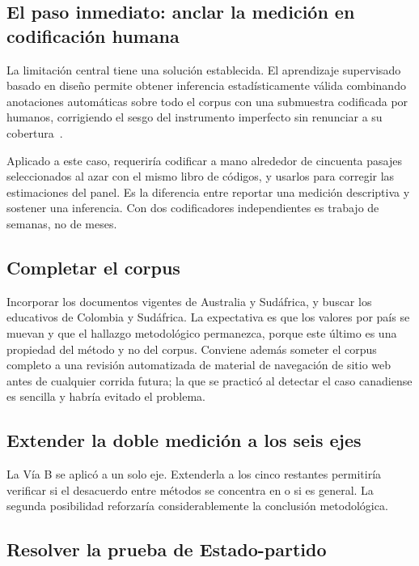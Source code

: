 \subsection{El paso inmediato: anclar la medición en codificación humana}

La limitación central tiene una solución establecida. El aprendizaje supervisado basado en diseño permite obtener inferencia estadísticamente válida combinando anotaciones automáticas sobre todo el corpus con una submuestra codificada por humanos, corrigiendo el sesgo del instrumento imperfecto sin renunciar a su cobertura~\citep{egami2023dsl}.

Aplicado a este caso, requeriría codificar a mano alrededor de cincuenta pasajes seleccionados al azar con el mismo libro de códigos, y usarlos para corregir las estimaciones del panel. Es la diferencia entre reportar una medición descriptiva y sostener una inferencia. Con dos codificadores independientes es trabajo de semanas, no de meses.

\subsection{Completar el corpus}

Incorporar los documentos vigentes de Australia y Sudáfrica, y buscar los educativos de Colombia y Sudáfrica. La expectativa es que los valores por país se muevan y que el hallazgo metodológico permanezca, porque este último es una propiedad del método y no del corpus. Conviene además someter el corpus completo a una revisión automatizada de material de navegación de sitio web antes de cualquier corrida futura; la que se practicó al detectar el caso canadiense es sencilla y habría evitado el problema.

\subsection{Extender la doble medición a los seis ejes}

La Vía B se aplicó a un solo eje. Extenderla a los cinco restantes permitiría verificar si el desacuerdo entre métodos se concentra en \dezhi o si es general. La segunda posibilidad reforzaría considerablemente la conclusión metodológica.

\subsection{Resolver la prueba de Estado-partido}


